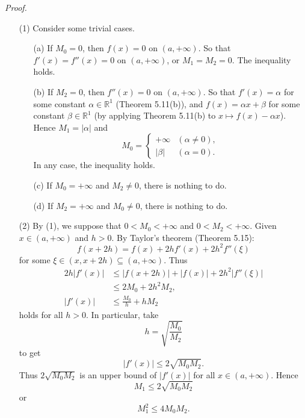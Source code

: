 \documentclass{article}
\begin{document}
\emph{Proof.}
\begin{enumerate}
\item[(1)]
  Consider some trivial cases.
  \begin{enumerate}
  \item[(a)]
  If $M_0 = 0$, then $f(x) = 0$ on $(a,+\infty)$.
  So that $f'(x) = f''(x) = 0$ on $(a,+\infty)$, or $M_1 = M_2 = 0$.
  The inequality holds.

  \item[(b)]
  If $M_2 = 0$, then $f''(x) = 0$ on $(a,+\infty)$.
  So that $f'(x) = \alpha$ for some constant $\alpha \in \mathbb{R}^1$ (Theorem 5.11(b)),
  and $f(x) = \alpha x + \beta$ for some constant $\beta \in \mathbb{R}^1$
  (by applying Theorem 5.11(b) to $x \mapsto f(x) - \alpha x$).
  Hence $M_1 = |\alpha|$ and
  \begin{equation*}
  M_0 =
    \begin{cases}
      +\infty & (\alpha \neq 0), \\
      |\beta| & (\alpha = 0).
    \end{cases}
  \end{equation*}
  In any case, the inequality holds.

  \item[(c)]
  If $M_0 = +\infty$ and $M_2 \neq 0$, there is nothing to do.

  \item[(d)]
  If $M_2 = +\infty$ and $M_0 \neq 0$, there is nothing to do.
  \end{enumerate}

\item[(2)]
By (1), we suppose that $0 < M_0 < +\infty$ and $0 < M_2 < +\infty$.
Given $x \in (a,+\infty)$ and $h>0$.
By Taylor's theorem (Theorem 5.15):
\[
  f(x+2h) = f(x) + 2h f'(x) + 2 h^2 f''(\xi)
\]
for some $\xi \in (x,x+2h) \subseteq (a,+\infty)$.
Thus
\begin{align*}
  2h|f'(x)|
  &\leq |f(x+2h)| + |f(x)| + 2 h^2 |f''(\xi)| \\
  &\leq 2 M_0 + 2 h^2 M_2, \\
  |f'(x)|
  &\leq \frac{M_0}{h} + h M_2
\end{align*}
holds for all $h > 0$.
In particular, take
\[
  h = \sqrt{\frac{M_0}{M_2}}
\]
to get
\[
  |f'(x)| \leq 2 \sqrt{M_0 M_2}.
\]
Thus $2 \sqrt{M_0 M_2}$ is an upper bound of $|f'(x)|$ for all $x \in (a,+\infty)$.
Hence
\[
  M_1 \leq 2 \sqrt{M_0 M_2}
\]
or
\[
  M_1^2 \leq 4 M_0 M_2.
\]


\end{enumerate}
\end{document}
